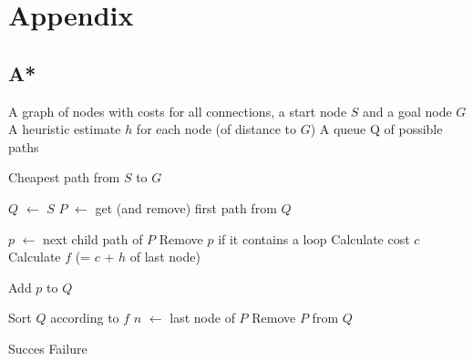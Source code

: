 \documentclass[alternative-exam.tex]{subfiles}
\newcommand{\algorithmicinput}{\textbf{Input:}}
\newcommand{\algorithmicoutput}{\textbf{Output:}}
\newcommand{\INPUT}{\item[\algorithmicinput]}
\newcommand{\OUTPUT}{\item[\algorithmicoutput]}
\newcommand{\algorithmicalgo}{\textbf{Algorithm:}}
\newcommand{\ALGO}{\item[\algorithmicalgo]}
\begin{document}
\appendix
\chapter{Appendix}
\section{A*}
\pagestyle{empty}
\begin{algorithmic}
\label{A*}
\INPUT
\STATE A graph of nodes with costs for all connections, a start node $S$ and a goal node $G$
\STATE A heuristic estimate $h$ for each node (of distance to $G$)
\STATE A queue Q of possible paths

\OUTPUT
\STATE Cheapest path from $S$ to $G$
\end{algorithmic}
\begin{algorithmic}
\ALGO
\STATE $Q$ $\leftarrow$ $S$
\STATE $P$ $\leftarrow$ get (and remove) first path from $Q$
\STATE \vspace{-0.5cm}

\STATE $p$ $\leftarrow$ next child path of $P$
\STATE Remove $p$ if it contains a loop
\STATE Calculate cost $c$
\STATE Calculate $f$ (= $c$ + $h$ of last node)

\STATE Add $p$ to $Q$
\ENDWHILE


\STATE Sort $Q$ according to $f$
\STATE $n$ $\leftarrow$ last node of $P$
\STATE Remove $P$ from $Q$
\ENDIF
\ENDFOR

\ENDWHILE
{}
\STATE Succes
\ELSE
\STATE Failure
\ENDIF
\end{algorithmic}
\pagebreak
\end{document}
